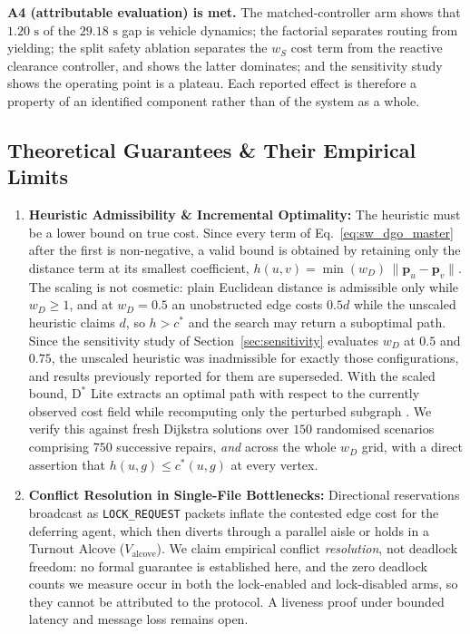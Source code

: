 \documentclass[journal]{IEEEtran}
\begin{document}
\textbf{A4 (attributable evaluation) is met.} The matched-controller arm shows that
$1.20\text{ s}$ of the $29.18\text{ s}$ gap is vehicle dynamics; the factorial
separates routing from yielding; the split safety ablation separates the $w_S$ cost
term from the reactive clearance controller, and shows the latter dominates; and the
sensitivity study shows the operating point is a plateau. Each reported effect is
therefore a property of an identified component rather than of the system as a whole.

\subsection{Theoretical Guarantees \& Their Empirical Limits}
\begin{enumerate}
    \item \textbf{Heuristic Admissibility \& Incremental Optimality:}
    \label{sec:admissibility}
    The heuristic must be a lower bound on true cost. Since every term of
    Eq.~\eqref{eq:sw_dgo_master} after the first is non-negative, a valid bound is
    obtained by retaining only the distance term at its smallest coefficient,
    $h(u, v) = \min(w_D)\,\lVert \mathbf{p}_u - \mathbf{p}_v \rVert$. The scaling is
    not cosmetic: plain Euclidean distance is admissible only while $w_D \ge 1$, and
    at $w_D = 0.5$ an unobstructed edge costs $0.5d$ while the unscaled heuristic
    claims $d$, so $h > c^*$ and the search may return a suboptimal path. Since the
    sensitivity study of Section~\ref{sec:sensitivity} evaluates $w_D$ at $0.5$ and
    $0.75$, the unscaled heuristic was inadmissible for exactly those configurations,
    and results previously reported for them are superseded. With the scaled bound,
    $\text{D}^*$ Lite extracts an optimal path with respect to the currently observed
    cost field while recomputing only the perturbed subgraph \cite{koenig2002dstar}.
    We verify this against fresh Dijkstra solutions over $150$ randomised scenarios
    comprising $750$ successive repairs, \emph{and} across the whole $w_D$ grid, with
    a direct assertion that $h(u, g) \le c^*(u, g)$ at every vertex.
    \item \textbf{Conflict Resolution in Single-File Bottlenecks:} Directional reservations broadcast as \texttt{LOCK\_REQUEST} packets inflate the contested edge cost for the deferring agent, which then diverts through a parallel aisle or holds in a Turnout Alcove ($V_{\text{alcove}}$). We claim empirical conflict \emph{resolution}, not deadlock freedom: no formal guarantee is established here, and the zero deadlock counts we measure occur in both the lock-enabled and lock-disabled arms, so they cannot be attributed to the protocol. A liveness proof under bounded latency and message loss remains open.
\end{enumerate}
\end{document}
